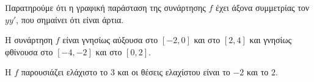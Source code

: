 \begin{alist}
\item Παρατηρούμε ότι η γραφική παράσταση της συνάρτησης $f$ έχει άξονα συμμετρίας τον $yy'$, που σημαίνει ότι είναι άρτια.
\item Η συνάρτηση $f$ είναι γνησίως αύξουσα στο $[-2, 0]$ και στο $[2, 4]$ και γνησίως φθίνουσα στο $[-4, -2]$ και στο $[0, 2]$.
\item Η $f$ παρουσιάζει ελάχιστο το $3$ και οι θέσεις ελαχίστου είναι το $-2$ και το $2$.
\end{alist}

